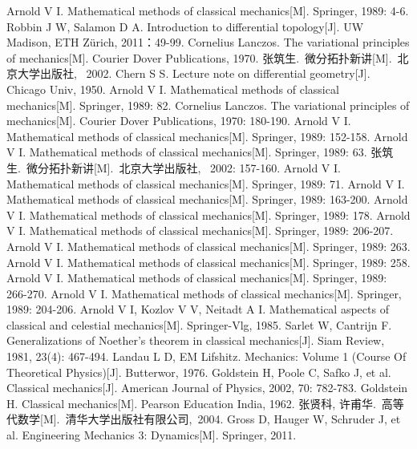 \documentclass[UTF8,10.5pt,a4paper]{ctexart}
\numberwithin{equation}{section}
\theoremstyle{definition}
\theoremstyle{definition}
\begin{document}
\begin{thebibliography}{MM}
\addtolength{\itemsep}{-0.5em}%
\begin{small}
 Arnold V I. Mathematical methods of classical mechanics[M]. Springer, 1989: 4-6.
 Robbin J W, Salamon D A. Introduction to differential topology[J]. UW Madison, ETH Zürich, 2011：49-99.
 Cornelius Lanczos. The variational principles of mechanics[M]. Courier Dover Publications, 1970.
 张筑生.\ 微分拓扑新讲[M].\ 北京大学出版社, \ 2002.
 Chern S S. Lecture note on differential geometry[J]. Chicago Univ, 1950.
 Arnold V I. Mathematical methods of classical mechanics[M]. Springer, 1989: 82.
 Cornelius Lanczos. The variational principles of mechanics[M]. Courier Dover Publications, 1970: 180-190.
 Arnold V I. Mathematical methods of classical mechanics[M]. Springer, 1989: 152-158.
 Arnold V I. Mathematical methods of classical mechanics[M]. Springer, 1989: 63.
 张筑生.\ 微分拓扑新讲[M].\ 北京大学出版社, \ 2002: 157-160.
 Arnold V I. Mathematical methods of classical mechanics[M]. Springer, 1989: 71.
 Arnold V I. Mathematical methods of classical mechanics[M]. Springer, 1989: 163-200.
 Arnold V I. Mathematical methods of classical mechanics[M]. Springer, 1989: 178.
 Arnold V I. Mathematical methods of classical mechanics[M]. Springer, 1989: 206-207.
 Arnold V I. Mathematical methods of classical mechanics[M]. Springer, 1989: 263.
 Arnold V I. Mathematical methods of classical mechanics[M]. Springer, 1989: 258.
 Arnold V I. Mathematical methods of classical mechanics[M]. Springer, 1989: 266-270.
 Arnold V I. Mathematical methods of classical mechanics[M]. Springer, 1989: 204-206.
 Arnold V I, Kozlov V V, Neitadt A I. Mathematical aspects of classical and celestial mechanics[M]. Springer-Vlg, 1985.
 Sarlet W, Cantrijn F. Generalizations of Noether's theorem in classical mechanics[J]. Siam Review, 1981, 23(4): 467-494.
 Landau L D, EM Lifshitz. Mechanics: Volume 1 (Course Of Theoretical Physics)[J]. Butterwor, 1976.
 Goldstein H, Poole C, Safko J, et al. Classical mechanics[J]. American Journal of Physics, 2002, 70: 782-783.
 Goldstein H. Classical mechanics[M]. Pearson Education India, 1962.
 张贤科, 许甫华.\ 高等代数学[M].\ 清华大学出版社有限公司,\ 2004.
 Gross D, Hauger W, Schruder J, et al. Engineering Mechanics 3: Dynamics[M]. Springer, 2011.


\end{small}
\end{thebibliography}
\end{document}
